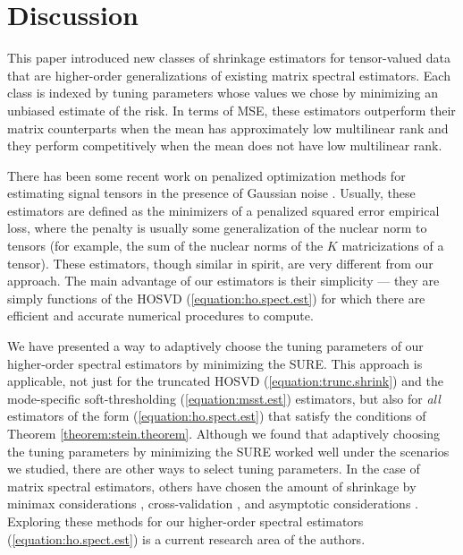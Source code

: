 \section{Discussion}
\label{sec:discussion}

This paper introduced new classes of shrinkage estimators for
tensor-valued data that are higher-order generalizations of existing
matrix spectral estimators. Each class is indexed by tuning parameters
whose values we chose by minimizing an unbiased estimate of the
risk. In terms of MSE, these estimators outperform their matrix
counterparts when the mean has approximately low multilinear rank and
they perform competitively when the mean does not have low multilinear
rank.

There has been some recent work on penalized optimization methods for
estimating signal tensors in the presence of Gaussian noise
\citep{signoretto2010convex,tomioka2011estimation,tomioka2011statistical,liu2013tensor,tomioka2013convex}. Usually,
these estimators are defined as the minimizers of a penalized squared
error empirical loss, where the penalty is usually some generalization
of the nuclear norm to tensors (for example, the sum of the nuclear
norms of the $K$ matricizations of a tensor). These estimators, though
similar in spirit, are very different from our approach. The main
advantage of our estimators is their simplicity --- they are simply
functions of the HOSVD (\ref{equation:ho.spect.est}) for which there
are efficient and accurate numerical procedures to compute.

We have presented a way to adaptively choose the tuning parameters of
our higher-order spectral estimators by minimizing the SURE. This
approach is applicable, not just for the truncated HOSVD
(\ref{equation:trunc.shrink}) and the mode-specific soft-thresholding
(\ref{equation:msst.est}) estimators, but also for \emph{all}
estimators of the form (\ref{equation:ho.spect.est}) that satisfy the
conditions of Theorem \ref{theorem:stein.theorem}.  Although we found
that adaptively choosing the tuning parameters by minimizing the SURE
worked well under the scenarios we studied, there are other ways to
select tuning parameters. In the case of matrix spectral estimators,
others have chosen the amount of shrinkage by minimax considerations
\citep{efron1972empirical,stein1981estimation}, cross-validation
\citep{bro2008cross,owen2009bi,josse2012selecting}, and asymptotic
considerations
\citep{gavish2014optimalhard,gavish2014optimal}. Exploring these
methods for our higher-order spectral estimators
(\ref{equation:ho.spect.est}) is a current research area of the
authors.

